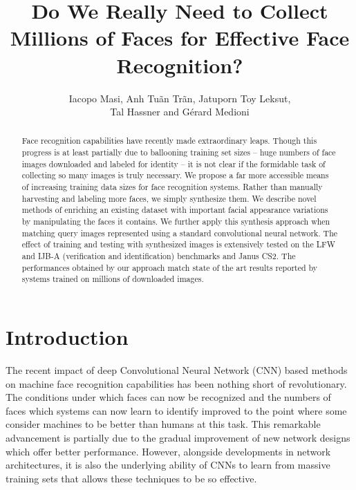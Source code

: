 \documentclass[runningheads]{llncs}
\begin{document}
\pagestyle{headings}
\mainmatter

\title{Do We Really Need to Collect Millions of Faces for Effective Face Recognition?} 

\author{Iacopo Masi, Anh Tu\~{a}n Tr\~{a}n, Jatuporn Toy Leksut,\\Tal Hassner and G\'{e}rard Medioni}



\maketitle

\begin{abstract}
Face recognition capabilities have recently made extraordinary leaps. Though this progress is at least partially due to ballooning training set sizes -- huge numbers of face images downloaded and labeled for identity -- it is not clear if the formidable task of collecting so many images is truly necessary. We propose a far more accessible means of increasing training data sizes for face recognition systems. Rather than manually harvesting and labeling more faces, we simply synthesize them. We describe novel methods of enriching an existing dataset with important facial appearance variations by manipulating the faces it contains. We further apply this synthesis approach when matching query images represented using a standard convolutional neural network. The effect of training and testing with synthesized images is extensively tested on the LFW and IJB-A (verification and identification) benchmarks and Janus CS2. The performances obtained by our approach match state of the art results reported by systems trained on millions of downloaded images. 
\end{abstract}
 

\section{Introduction}\label{sec:intro}
The recent impact of deep Convolutional Neural Network (CNN) based methods on machine face recognition capabilities has been nothing short of revolutionary. The conditions under which faces can now be recognized and the numbers of faces which systems can now learn to identify improved to the point where some consider machines to be better than humans at this task. This remarkable advancement is partially due to the gradual improvement of new network designs which offer better performance. However, alongside developments in network architectures, it is also the underlying ability of CNNs to learn from massive training sets that allows these techniques to be so effective. 
\end{document}
